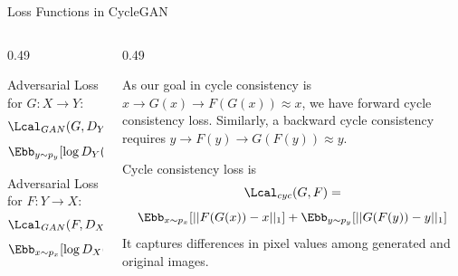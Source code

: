 \documentclass[aspectratio=169,xcolor=dvipsnames,svgnames,x11names,fleqn]{beamer}
\begin{document}
\begin{frame}{Loss Functions in CycleGAN}
    \begin{columns}[T]
        \begin{column}{0.49\textwidth}
            \begin{tcolorbox}[lossbox=Adversarial Loss]
                \scriptsize
                Adversarial Loss for $G: X \to Y$:
                \begin{equation*}
                \Lcal_{GAN}(G, D_Y, X, Y) = 
                \end{equation*}
                \vspace{-1.5em}
                \begin{equation*}
                \Ebb_{y\sim p_{y}}[\log D_Y(y)] + \Ebb_{x\sim p_{x}}[\log (1 - D_Y(G(x)))]
                \end{equation*}

                \hrulefill
                
                Adversarial Loss for $F: Y \to X$:
                \begin{equation*}
                \Lcal_{GAN}(F, D_X, Y, X) = 
                \end{equation*}
                \vspace{-1.5em}
                \begin{equation*}
                \Ebb_{x\sim p_{x}}[\log D_X(x)] + \Ebb_{y\sim p_{y}}[\log (1 - D_X(G(y)))]
                \end{equation*}
            \end{tcolorbox}
        \end{column}

        \begin{column}{0.49\textwidth}
            \begin{tcolorbox}[lossbox=Cycle Consistency Loss, colframe=CycleGreen]
                \scriptsize
                As our goal in cycle consistency is $x \to G(x) \to F(G(x)) \approx x$, we have forward cycle consistency loss. Similarly, a backward cycle consistency requires $y \to F(y) \to G(F(y)) \approx y$.
                

                Cycle consistency loss is
                \begin{equation*}
                \Lcal_{cyc}(G, F) = 
                \end{equation*}
                \vspace{-1.5em}
                \begin{equation*}
                \Ebb_{x\sim p_{x}}[ || F(G(x)) - x||_1] + \Ebb_{y\sim p_{y}}[ || G(F(y)) - y||_1]
                \end{equation*}
                It captures differences in pixel values among generated and original images.
            \end{tcolorbox}
        \end{column}
    \end{columns}




\end{frame}
\end{document}

